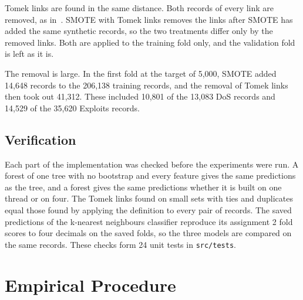 \documentclass[conference,10pt]{IEEEtran}
\begin{document}
Tomek links are found in the same distance. Both records of every link are removed, as
in~\cite{batista2004study}. SMOTE with Tomek links removes the links after
SMOTE has added the same synthetic records, so the two treatments differ only
by the removed links. Both are applied to the training fold only, and the
validation fold is left as it is.

The removal is large. In the first fold at the target of 5,000, SMOTE added
14,648 records to the 206,138 training records, and the removal of Tomek
links then took out 41,312. These included 10,801 of the 13,083 DoS records
and 14,529 of the 35,620 Exploits records.

\subsection{Verification}
\label{subsec:impl_verification}

Each part of the implementation was checked before the experiments were
run. A forest of one tree with no bootstrap and every feature gives the
same predictions as the tree, and a forest gives the same predictions
whether it is built on one thread or on four. The Tomek links found on
small sets with ties and duplicates equal those found by applying the
definition to every pair of records. The saved predictions of the
k-nearest neighbours classifier reproduce its assignment 2 fold scores to
four decimals on the saved folds, so the three models are compared on the
same records. These checks form 24 unit tests in \texttt{src/tests}.

\section{Empirical Procedure}
\label{sec:empirical}
\end{document}
